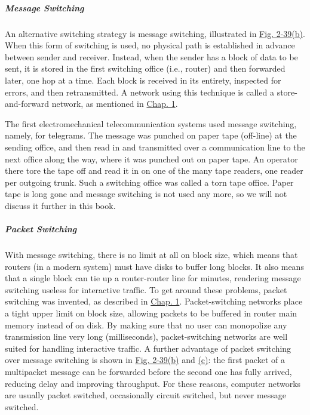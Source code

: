 \protect\hypertarget{0130661023_ch02lev1sec5.htmlux5cux23ch02lev3sec17}{}{}

\subparagraph{Message Switching}

An alternative switching strategy is {message switching}, illustrated in
\protect\hyperlink{0130661023_ch02lev1sec5.htmlux5cux23ch02fig39}{Fig.
2-39(b)}. When this form of switching is used, no physical path is
established in advance between sender and receiver. Instead, when the
sender has a block of data to be sent, it is stored in the first
switching office (i.e., router) and then forwarded later, one hop at a
time. Each block is received in its entirety, inspected for errors, and
then retransmitted. A network using this technique is called a
{store-and-forward} network, as mentioned in
\protect\hyperlink{0130661023_ch01.htmlux5cux23ch01}{Chap. 1}.

The first electromechanical telecommunication systems used message
switching, namely, for telegrams. The message was punched on paper tape
(off-line) at the sending office, and then read in and transmitted over
a communication line to the next office along the way, where it was
punched out on paper tape. An operator there tore the tape off and read
it in on one of the many tape readers, one reader per outgoing trunk.
Such a switching office was called a {torn tape office}. Paper tape is
long gone and message switching is not used any more, so we will not
discuss it further in this book.

\protect\hypertarget{0130661023_ch02lev1sec5.htmlux5cux23ch02lev3sec18}{}{}

\subparagraph{Packet Switching}

With message switching, there is no limit at all on block size, which
means that routers (in a modern system) must have disks to buffer long
blocks. It also means that a single block can tie up a router-router
line for minutes, rendering message switching useless for interactive
traffic. To get around these problems, {packet switching} was invented,
as described in
\protect\hyperlink{0130661023_ch01.htmlux5cux23ch01}{Chap. 1}.
Packet-switching networks place a tight upper limit on block size,
allowing packets to be buffered in router main memory instead of on
disk. By making sure that no user can monopolize any transmission line
very long (milliseconds), packet-switching networks are well suited for
handling interactive traffic. A further advantage of packet switching
over message switching is shown in
\protect\hyperlink{0130661023_ch02lev1sec5.htmlux5cux23ch02fig39}{Fig.
2-39(b)} and
\protect\hyperlink{0130661023_ch02lev1sec5.htmlux5cux23ch02fig39}{(c)}:
the first packet of a multipacket message can be forwarded before the
second one has fully arrived, reducing delay and improving throughput.
For these reasons, computer networks are usually packet switched,
occasionally circuit switched, but never message switched.


